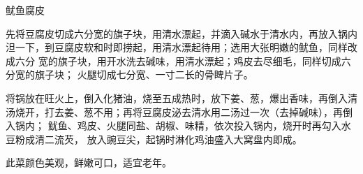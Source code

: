 %
%
%
%
%
%
%
\begin{recipe}{鱿鱼腐皮}

\ingredients


\preparation

\step 先将豆腐皮切成六分宽的旗子块，用清水漂起，并滴入碱水于清水内，再放入锅内
泹一下，到豆腐皮软和时即捞起，用清水漂起待用；选用大张明嫩的鱿鱼，同样改成六分
宽的旗子块，用开水洗去碱味，用清水漂起；鸡皮去尽细毛，同样切成六分宽的旗子块；
火腿切成七分宽、一寸二长的骨睥片子。

\step 将锅放在旺火上，倒入化猪油，烧至五成热时，放下姜、葱，爆出香味，再倒入清
汤烧开，打去姜、葱不用；再将豆腐皮泌去清水用二汤过一次（去掉碱味），再倒入锅内；
鱿鱼、鸡皮、火腿同盐、胡椒、味精，依次投入锅内，烧开时再勾入水豆粉成清二流芡，
放入豌豆尖，起锅时淋化鸡油盛入大窝盘内即成。

\features

此菜颜色美观，鲜嫩可口，适宜老年。

\end{recipe}

